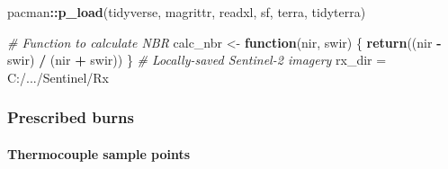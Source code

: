 \documentclass[
]{article}
\newenvironment{Shaded}{\begin{snugshade}}{\end{snugshade}}
\newcommand{\CommentTok}[1]{\textcolor[rgb]{0.56,0.35,0.01}{\textit{#1}}}
\newcommand{\ControlFlowTok}[1]{\textcolor[rgb]{0.13,0.29,0.53}{\textbf{#1}}}
\newcommand{\FunctionTok}[1]{\textcolor[rgb]{0.13,0.29,0.53}{\textbf{#1}}}
\newcommand{\NormalTok}[1]{#1}
\newcommand{\OtherTok}[1]{\textcolor[rgb]{0.56,0.35,0.01}{#1}}
\newcommand{\SpecialCharTok}[1]{\textcolor[rgb]{0.81,0.36,0.00}{\textbf{#1}}}
\newcommand{\StringTok}[1]{\textcolor[rgb]{0.31,0.60,0.02}{#1}}
\begin{document}
\begin{Shaded}
\begin{Highlighting}[]
\NormalTok{pacman}\SpecialCharTok{::}\FunctionTok{p\_load}\NormalTok{(tidyverse, magrittr, readxl, sf, terra, tidyterra)}

\CommentTok{\# Function to calculate NBR }
\NormalTok{    calc\_nbr }\OtherTok{\textless{}{-}} \ControlFlowTok{function}\NormalTok{(nir, swir) \{}
                  \FunctionTok{return}\NormalTok{((nir }\SpecialCharTok{{-}}\NormalTok{ swir) }\SpecialCharTok{/}\NormalTok{ (nir }\SpecialCharTok{+}\NormalTok{ swir)) \}}
\CommentTok{\# Locally{-}saved Sentinel{-}2 imagery}
\NormalTok{  rx\_dir }\OtherTok{=} \StringTok{\textquotesingle{}C:/.../Sentinel/Rx\textquotesingle{}} 
\end{Highlighting}
\end{Shaded}

\subsubsection{Prescribed burns}\label{prescribed-burns}

\paragraph{Thermocouple sample points}\label{thermocouple-sample-points}
\end{document}
